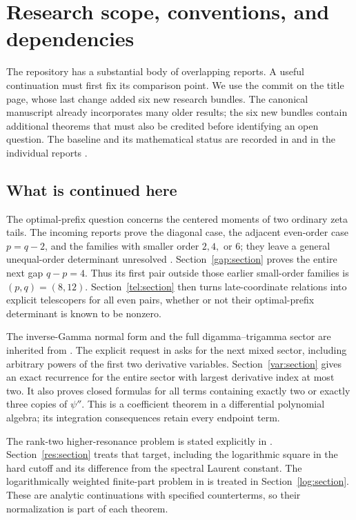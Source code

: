 \section{Research scope, conventions, and dependencies}
\label{sec:scope}

The repository has a substantial body of overlapping reports. A useful
continuation must first fix its comparison point. We use the commit on
the title page, whose last change added six new research bundles.
The canonical manuscript already incorporates many older results;
the six new bundles contain additional theorems that must also be
credited before identifying an open question. The baseline and its
mathematical status are recorded in \cite{Repo,Incoming} and in the
individual reports \cite{BTD,CTD,DHR,DPL,MR,PTI}.

\subsection{What is continued here}

The optimal-prefix question concerns the centered moments of two
ordinary zeta tails. The incoming reports prove the diagonal case,
the adjacent even-order case $p=q-2$, and the families with smaller
order $2,4,$ or $6$; they leave a general unequal-order determinant
unresolved \cite{BTD,DPL,PTI}. Section~\ref{gap:section} proves the
entire next gap $q-p=4$. Thus its first pair outside those earlier
small-order families is $(p,q)=(8,12)$. Section~\ref{tel:section}
then turns late-coordinate relations into explicit telescopers for
all even pairs, whether or not their optimal-prefix determinant is
known to be nonzero.

The inverse-Gamma normal form and the full digamma--trigamma sector
are inherited from \cite{DPL,PTI}. The explicit request in
\cite[research questions 4--5]{PTI} asks for the next mixed sector,
including arbitrary powers of the first two derivative variables.
Section~\ref{var:section} gives an exact recurrence for the entire
sector with largest derivative index at most two. It also proves
closed formulas for all terms containing exactly two or exactly three
copies of $\psi''$. This is a coefficient theorem in a differential
polynomial algebra; its integration consequences retain every endpoint
term.

The rank-two higher-resonance problem is stated explicitly in
\cite[Section 9]{DHR}. Section~\ref{res:section} treats that target,
including the logarithmic square in the hard cutoff and its difference
from the spectral Laurent constant. The logarithmically weighted
finite-part problem in \cite{DPL} is treated in
Section~\ref{log:section}. These are analytic continuations with
specified counterterms, so their normalization is part of each theorem.

